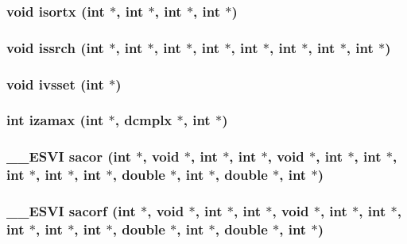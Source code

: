 \subsubsection{\setlength{\rightskip}{0pt plus 5cm}void isortx (int $\ast$, int $\ast$, int $\ast$, int $\ast$)}\label{essl_8h_e561b246c683d466b2528d322a9da313}


\subsubsection{\setlength{\rightskip}{0pt plus 5cm}void issrch (int $\ast$, int $\ast$, int $\ast$, int $\ast$, int $\ast$, int $\ast$, int $\ast$, int $\ast$)}\label{essl_8h_e4d77199ec7c5d7c48256d01a5504a0e}


\subsubsection{\setlength{\rightskip}{0pt plus 5cm}void ivsset (int $\ast$)}\label{essl_8h_a90226adee7f09728642eb4930598ba2}


\subsubsection{\setlength{\rightskip}{0pt plus 5cm}int izamax (int $\ast$, {\bf dcmplx} $\ast$, int $\ast$)}\label{essl_8h_97333274d5f6ba9f374d2acafe41ae69}


\subsubsection{\setlength{\rightskip}{0pt plus 5cm}\_\-\_\-ESVI sacor (int $\ast$, void $\ast$, int $\ast$, int $\ast$, void $\ast$, int $\ast$, int $\ast$, int $\ast$, int $\ast$, int $\ast$, double $\ast$, int $\ast$, double $\ast$, int $\ast$)}\label{essl_8h_0ef2376e67377b0a9da2f3f8f1e91293}


\subsubsection{\setlength{\rightskip}{0pt plus 5cm}\_\-\_\-ESVI sacorf (int $\ast$, void $\ast$, int $\ast$, int $\ast$, void $\ast$, int $\ast$, int $\ast$, int $\ast$, int $\ast$, int $\ast$, double $\ast$, int $\ast$, double $\ast$, int $\ast$)}\label{essl_8h_94be251b0acbfbd4573a79b2f18fedea}


